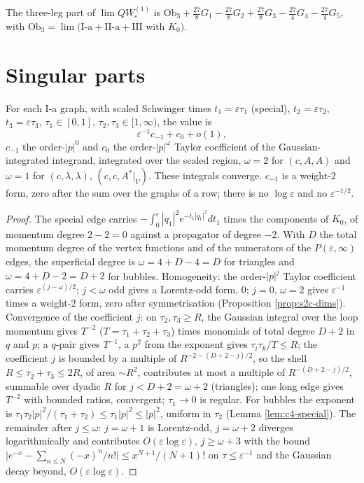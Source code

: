 \begin{remark}
\label{rem:s2c-total}
The three-leg part of $\lim QW^{(1)}_\varepsilon$ is $\mathrm{Ob}_3+\tfrac{27}8G_1-\tfrac{27}8G_2+\tfrac{27}8G_3-\tfrac{27}4G_4-\tfrac{27}4G_5$, with $\mathrm{Ob}_3=\lim\big(\text{I-a}+\text{II-a}+\text{III with }K_0\big)$.
\end{remark}

\section{Singular parts}

\begin{proposition}
\label{prop:s2c-Ia}
For each I-a graph, with scaled Schwinger times $t_1=\varepsilon\tau_1$ (special), $t_2=\varepsilon\tau_2$, $t_3=\varepsilon\tau_3$, $\tau_1\in[0,1]$, $\tau_2,\tau_3\in[1,\infty)$, the value is
\[
\varepsilon^{-1}c_{-1}+c_0+o(1),
\]
$c_{-1}$ the order-$|p|^0$ and $c_0$ the order-$|p|^{\omega}$ Taylor coefficient of the Gaussian-integrated integrand, integrated over the scaled region, $\omega=2$ for $(c,A,A)$ and $\omega=1$ for $(c,\lambda,\lambda)$, $(c,c,A^*|_V)$. These integrals converge. $c_{-1}$ is a weight-$2$ form, zero after the sum over the graphs of a row; there is no $\log\varepsilon$ and no $\varepsilon^{-1/2}$.
\end{proposition}

\begin{proof}
The special edge carries $-\int_0^\varepsilon|q_1|^2e^{-t_1|q_1|^2}dt_1$ times the components of $K_0$, of momentum degree $2-2=0$ against a propagator of degree $-2$. With $D$ the total momentum degree of the vertex functions and of the numerators of the $P(\varepsilon,\infty)$ edges, the superficial degree is $\omega=4+D-4=D$ for triangles and $\omega=4+D-2=D+2$ for bubbles. Homogeneity: the order-$|p|^j$ Taylor coefficient carries $\varepsilon^{(j-\omega)/2}$; $j<\omega$ odd gives a Lorentz-odd form, $0$; $j=0$, $\omega=2$ gives $\varepsilon^{-1}$ times a weight-$2$ form, zero after symmetrisation (Proposition \ref{prop:s2c-dims}). Convergence of the coefficient $j$: on $\tau_2,\tau_3\ge R$, the Gaussian integral over the loop momentum gives $T^{-2}$ ($T=\tau_1+\tau_2+\tau_3$) times monomials of total degree $D+2$ in $q$ and $p$; a $q$-pair gives $T^{-1}$, a $p^2$ from the exponent gives $\tau_i\tau_k/T\le R$; the coefficient $j$ is bounded by a multiple of $R^{-2-(D+2-j)/2}$, so the shell $R\le\tau_2+\tau_3\le2R$, of area $\sim R^2$, contributes at most a multiple of $R^{-(D+2-j)/2}$, summable over dyadic $R$ for $j<D+2=\omega+2$ (triangles); one long edge gives $T^{-2}$ with bounded ratios, convergent; $\tau_1\to0$ is regular. For bubbles the exponent is $\tau_1\tau_2|p|^2/(\tau_1+\tau_2)\le\tau_1|p|^2\le|p|^2$, uniform in $\tau_2$ (Lemma \ref{lem:c4-special}). The remainder after $j\le\omega$: $j=\omega+1$ is Lorentz-odd, $j=\omega+2$ diverges logarithmically and contributes $O(\varepsilon\log\varepsilon)$, $j\ge\omega+3$ with the bound $\big|e^{-x}-\sum_{n\le N}(-x)^n/n!\big|\le x^{N+1}/(N+1)!$ on $\tau\le\varepsilon^{-1}$ and the Gaussian decay beyond, $O(\varepsilon\log\varepsilon)$.
\end{proof}

